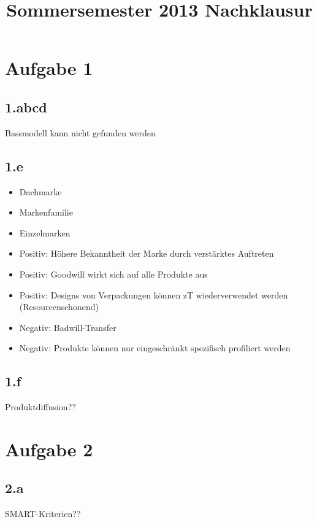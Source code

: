 

\title{Sommersemester 2013 Nachklausur}
\maketitle


\section*{Aufgabe 1}
\subsection*{1.abcd}
    Bassmodell kann nicht gefunden werden

\subsection*{1.e}
    \begin{itemize}
        \item Dachmarke
        \item Markenfamilie
        \item Einzelmarken
    \end{itemize}

    \begin{itemize}
        \item Positiv: Höhere Bekanntheit der Marke durch verstärktes Auftreten
        \item Positiv: Goodwill wirkt sich auf alle Produkte aus
        \item Positiv: Designs von Verpackungen können zT wiederverwendet werden (Resourcenschonend)
        \item Negativ: Badwill-Transfer
        \item Negativ: Produkte können nur eingeschränkt spezifisch profiliert werden
    \end{itemize}

\subsection*{1.f}
    Produktdiffusion??

\section*{Aufgabe 2}
\subsection*{2.a}
    SMART-Kriterien??

